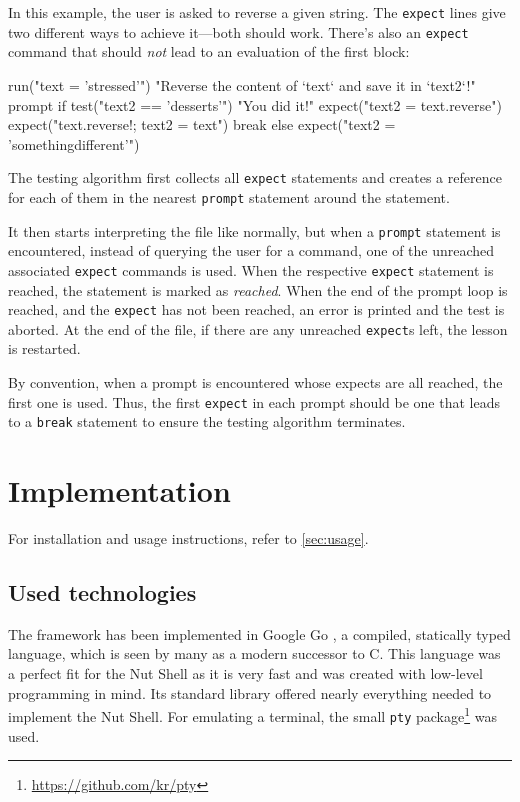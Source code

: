 \documentclass[paper=a4,twoside,abstract=on,cleardoublepage=empty,numbers=noenddot,toc=bib,toc=listof,12pt,appendixprefix=true]{scrreprt}
\begin{document}
In this example, the user is asked to reverse a given string. The \texttt{expect} lines give two different ways to achieve it---both should work. There's also an \texttt{expect} command that should \emph{not} lead to an evaluation of the first block:

\begin{nutsh}
run("text = 'stressed'")
"Reverse the content of `text` and save it in `text2`!"
prompt {
    if test("text2 == 'desserts'") {
        "You did it!"
        expect("text2 = text.reverse")
        expect("text.reverse!; text2 = text")
        break
    } else {
        expect("text2 = 'somethingdifferent'")
    }
}
\end{nutsh}

The testing algorithm first collects all \texttt{expect} statements and creates a reference for each of them in the nearest \texttt{prompt} statement around the statement.

It then starts interpreting the file like normally, but when a \texttt{prompt} statement is encountered, instead of querying the user for a command, one of the unreached associated \texttt{expect} commands is used. When the respective \texttt{expect} statement is reached, the statement is marked as \emph{reached}. When the end of the prompt loop is reached, and the \texttt{expect} has not been reached, an error is printed and the test is aborted. At the end of the file, if there are any unreached \texttt{expect}s left, the lesson is restarted.

By convention, when a prompt is encountered whose expects are all reached, the first one is used. Thus, the first \texttt{expect} in each prompt should be one that leads to a \texttt{break} statement to ensure the testing algorithm terminates.

\section{Implementation}
\label{sec:implementation}

For installation and usage instructions, refer to \cref{sec:usage}.

\subsection*{Used technologies}

The framework has been implemented in Google Go \cite{google13}, a compiled, statically typed language, which is seen by many as a modern successor to C. This language was a perfect fit for the Nut Shell as it is very fast and was created with low-level programming in mind. Its standard library offered nearly everything needed to implement the Nut Shell. For emulating a terminal, the small \texttt{pty} package\footnote{\url{https://github.com/kr/pty}} was used.
\end{document}
